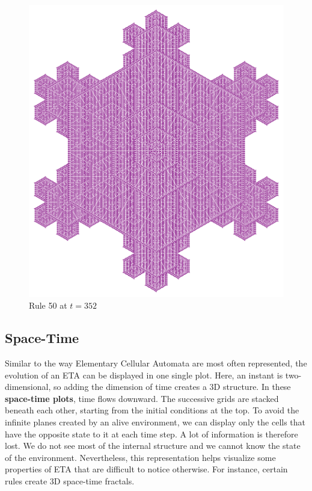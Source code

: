 \documentclass{article}
\begin{document}
\begin{figure}[H]
    \centering
    \includegraphics[width=\textwidth]{graphics/behavior/fractals/rule-50-time-352-OneAlive.pdf}
    \caption{Rule 50 at $t=352$}
    \label{fig:rule-50-time-352-OneAlive}
\end{figure}

\pagebreak
\subsection{Space-Time} \label{space-time}
Similar to the way Elementary Cellular Automata \cite{wolfram2002new, weisstein2002elementary} are most often represented, the evolution of an ETA can be displayed in one single plot. Here, an instant is two-dimensional, so adding the dimension of time creates a 3D structure. In these \textbf{space-time plots}, time flows downward. The successive grids are stacked beneath each other, starting from the initial conditions at the top. To avoid the infinite planes created by an alive environment, we can display only the cells that have the opposite state to it at each time step. A lot of information is therefore lost. We do not see most of the internal structure and we cannot know the state of the environment. Nevertheless, this representation helps visualize some properties of ETA that are difficult to notice otherwise. For instance, certain rules create 3D space-time fractals.
\end{document}
